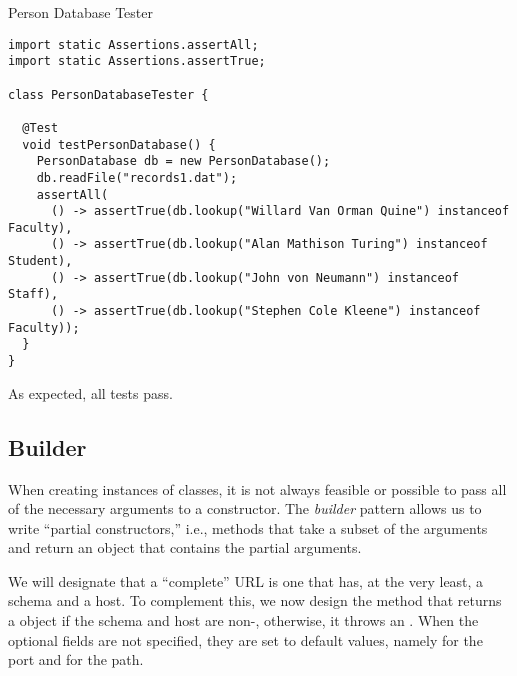 \begin{cl}{Person Database Tester}
\begin{lstlisting}[language=MyJava]
import static Assertions.assertAll;
import static Assertions.assertTrue;

class PersonDatabaseTester {

  @Test
  void testPersonDatabase() {
    PersonDatabase db = new PersonDatabase();
    db.readFile("records1.dat");
    assertAll(
      () -> assertTrue(db.lookup("Willard Van Orman Quine") instanceof Faculty),
      () -> assertTrue(db.lookup("Alan Mathison Turing") instanceof Student),
      () -> assertTrue(db.lookup("John von Neumann") instanceof Staff),
      () -> assertTrue(db.lookup("Stephen Cole Kleene") instanceof Faculty));
  }
}
\end{lstlisting}
\end{cl}

As expected, all tests pass.

\subsection{Builder}

When creating instances of classes, it is not always feasible or possible to pass all of the necessary arguments to a constructor. The \emph{builder} pattern allows us to write ``partial constructors,'' i.e., methods that take a subset of the arguments and return an object that contains the partial arguments. 


We will designate that a ``complete'' URL is one that has, at the very least, a schema and a host. To complement this, we now design the  method that returns a  object if the schema and host are non-, otherwise, it throws an . When the optional fields are not specified, they are set to default values, namely  for the port and  for the path.

